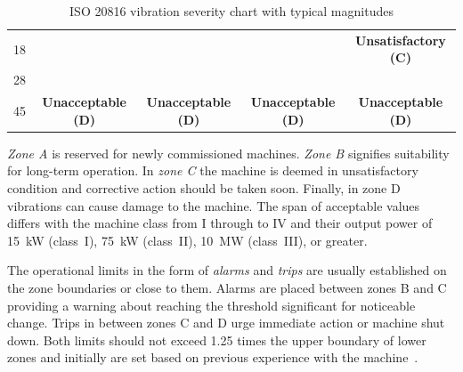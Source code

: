 \begin{table}[h]
\begin{adjustbox}{width=\columnwidth,center}
\begin{tabular}{|c|c|c|c|c|}
18                                                                                   & \cellcolor[HTML]{FD6864}                                                  & \cellcolor[HTML]{FD6864}                                                    & \cellcolor[HTML]{FD6864}                                                                     & \multirow{-2}{*}{\cellcolor[HTML]{F8A102}\textbf{Unsatisfactory (C)}}                         \\ \cline{1-1} \cline{5-5}
28                                                                                   & \cellcolor[HTML]{FD6864}                                                  & \cellcolor[HTML]{FD6864}                                                    & \cellcolor[HTML]{FD6864}                                                                     & \cellcolor[HTML]{FD6864}                                                                      \\ \cline{1-1}
45                                                                                   & \multirow{-5}{*}{\cellcolor[HTML]{FD6864}\textbf{Unacceptable (D)}}       & \multirow{-4}{*}{\cellcolor[HTML]{FD6864}\textbf{Unacceptable (D)}}         & \multirow{-3}{*}{\cellcolor[HTML]{FD6864}\textbf{Unacceptable (D)}}                          & \multirow{-2}{*}{\cellcolor[HTML]{FD6864}\textbf{Unacceptable (D)}}                           \\ \hline
\end{tabular}
\end{adjustbox}
\caption{ISO 20816 vibration severity chart with typical magnitudes \cite{noauthor_iso_2016}}
\label{tab:iso20816-vibration-severity}
\end{table}

\emph{Zone A} is reserved for newly commissioned machines. \emph{Zone B} signifies suitability for long-term operation. In \emph{zone C} the machine is deemed in unsatisfactory condition and corrective action should be taken soon. Finally, in zone D vibrations can cause damage to the machine. The span of acceptable values differs with the machine class from I through to IV and their output power of 15~kW (class~I), 75~kW (class~II), 10~MW (class~III), or greater.

The operational limits in the form of \emph{alarms} and \emph{trips} are usually established on the zone boundaries or close to them. Alarms are placed between zones B and C providing a warning about reaching the threshold significant for noticeable change. Trips in between zones C and D urge immediate action or machine shut down. Both limits should not exceed 1.25 times the upper boundary of lower zones and initially are set based on previous experience with the machine~\cite{noauthor_iso_2002}.

